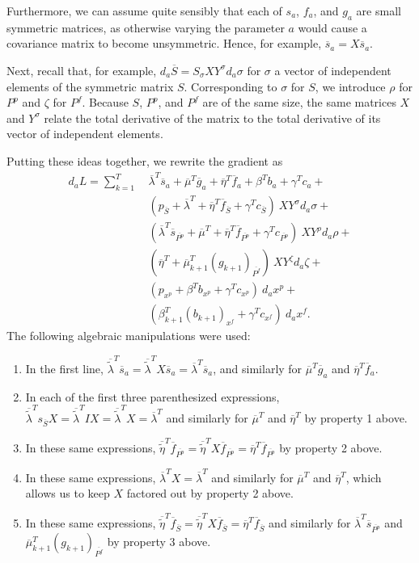 \documentclass[10pt,fleqn]{article}
\renewcommand{\vec}[1]{\ensuremath{\overline{#1}}}
\begin{document}
Furthermore, we can assume quite sensibly that each of $s_a$, $f_a$, and $g_a$
are small symmetric matrices, as otherwise varying the parameter $a$ would cause
a covariance matrix to become unsymmetric. Hence, for example, $\vec s_a = X
\vec s_a$.

Next, recall that, for example, $d_a \vec S = S_{\sigma} X Y^{\sigma} d_a
\sigma$ for $\sigma$ a vector of independent elements of the symmetric matrix
$S$. Corresponding to $\sigma$ for $S$, we introduce $\rho$ for $P^p$ and
$\zeta$ for $P^f$. Because $S$, $P^p$, and $P^f$ are of the same size, the same
matrices $X$ and $Y^{\sigma}$ relate the total derivative of the matrix to the
total derivative of its vector of independent elements.

Putting these ideas together, we rewrite the gradient as
\begin{align*}
  d_a L = \sum_{k = 1}^T \ & \vec\lambda^T \vec s_a +
    \vec\mu^T \vec g_a + \vec\eta^T \vec f_a + \beta^T b_a +
    \gamma^T c_a + \\
  & (p_{\vec S} + \vec\lambda^T +
     \vec\eta^T \vec f_{\vec S} +
     \gamma^T c_{\vec S}) \ X Y^{\sigma} d_a \sigma + \\
  & (\vec\lambda^T \vec s_{\vec{P^p}} +
     \vec\mu^T +
     \vec\eta^T \vec f_{\vec{P^p}} +
     \gamma^T c_{\vec{P^p}}) \ X Y^{\rho} d_a \rho + \\
  & (\vec\eta^T +
     \vec\mu_{k+1}^T (g_{k+1})_{\vec{P^f}}) \ X Y^{\zeta} d_a \zeta + \\
  & (p_{x^p} + \beta^T b_{x^p} + \gamma^T c_{x^p}) \ d_a x^p + \\
  & (\beta_{k+1}^T (b_{k+1})_{x^f} + \gamma^T c_{x^f}) \ d_a x^f.
\end{align*}
The following algebraic manipulations were used:
\begin{enumerate}
\item In the first line, $\vec{\tilde\lambda}^T \vec s_a = \vec{\tilde\lambda}^T
  X \vec s_a = \vec\lambda^T \vec s_a$, and similarly for $\vec\mu^T \vec g_a$
  and $\vec\eta^T \vec f_a$.
\item In each of the first three parenthesized expressions,
  $\vec{\tilde\lambda}^T s_{\vec S} X = \vec{\tilde\lambda}^T I X =
  \vec{\tilde\lambda}^T X = \vec\lambda^T$ and similarly for $\vec\mu^T$ and
  $\vec\eta^T$ by property 1 above.
\item In these same expressions, $\vec{\tilde\eta}^T \vec f_{\vec{P^p}} =
  \vec{\tilde\eta}^T X \vec f_{\vec{P^p}} = \vec\eta^T \vec f_{\vec{P^p}}$ by
  property 2 above.
\item In these same expressions, $\vec\lambda^T X = \vec\lambda^T$ and similarly
  for $\vec\mu^T$ and $\vec\eta^T$, which allows us to keep $X$ factored out by
  property 2 above.
\item In these same expressions, $\vec{\tilde\eta}^T \vec f_{\vec S} =
  \vec{\tilde\eta}^T X \vec f_{\vec S} = \vec\eta^T \vec f_{\vec S}$ and
  similarly for $\vec\lambda^T \vec s_{\vec{P^p}}$ and $\vec\mu_{k+1}^T
  (g_{k+1})_{\vec{P^f}}$ by property 3 above.
\end{enumerate}
\end{document}
